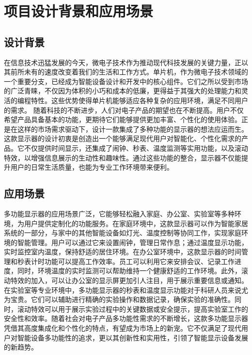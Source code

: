 \documentclass{textreportclass}  %
\begin{document}
	\thispagestyle{empty}%
	\pagestyle{bianyi}
	  
	
\newpage
\setcounter{page}{1}	
\pagestyle{bianyi}

	
\section{项目设计背景和应用场景}             %
	
	
	
	
	\subsection{设计背景}					%
	在信息技术迅猛发展的今天，微电子技术作为推动现代科技发展的关键力量，正以其前所未有的速度改变着我们的生活和工作方式。单片机，作为微电子技术领域的一个重要分支，已经成为智能设备设计和开发中的核心组件。它们之所以受到市场的广泛青睐，不仅因为体积的小巧和成本的低廉，更得益于其强大的处理能力和灵活的编程特性。这些优势使得单片机能够适应各种复杂的应用环境，满足不同用户的需求。
	随着科技的不断进步，人们对电子产品的期望也在不断提高。用户不仅希望产品具备基本的功能，更期待它们能够提供更加丰富、个性化的使用体验。正是在这样的市场需求驱动下，设计一款集成了多种功能的显示器的想法应运而生。这款显示器的设计初衷是创造出一个能够满足现代用户对智能化、个性化需求的产品。它不仅提供时间显示，还集成了闹钟、秒表、温度监测等实用功能，以及滚动特效，以增强信息展示的生动性和趣味性。通过这些功能的整合，显示器不仅能提升用户的日常生活质量，也能为专业工作环境带来便利。
	
	
	\subsection{应用场景}					%
	多功能显示器的应用场景广泛，它能够轻松融入家庭、办公室、实验室等多种环境，为用户提供定制化的功能服务。在家庭环境中，这款显示器可以作为智能家居系统的一部分，与家中的其他智能设备如灯光、温度控制等协同工作，实现家庭环境的智能管理。用户可以通过它来设置闹钟，管理日常作息；通过温度显示功能，实时监控室内温度，保持舒适的居住环境。在办公室环境中，这款显示器的时间管理和秒表计时功能可以提高工作效率。员工可以利用它来安排会议、记录工作进度，同时，环境温度的实时监测可以帮助维持一个健康舒适的工作环境。此外，滚动特效的加入，可以让办公室的显示屏更加引人注目，用于展示重要信息或通知。在实验室等专业环境中，多功能显示器的秒表和温度显示功能对于科研人员来说尤为宝贵。它们可以辅助进行精确的实验操作和数据记录，确保实验的准确性。同时，滚动特效可以用于展示实验过程中的关键数据或安全提示，提高实验室工作的安全性和效率。随着社会对电子产品多功能性需求的不断增长，这款多功能显示器凭借其高度集成化和个性化的特点，有望成为市场上的新宠。它不仅满足了现代用户对智能设备多功能性的追求，更以其创新性和实用性，引领了智能显示设备发展的新趋势。
	
\end{document}
